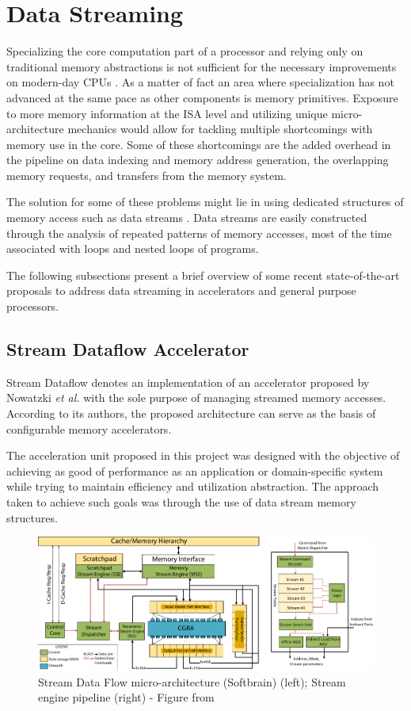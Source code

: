 \section{Data Streaming}
Specializing the core computation part of a processor and relying only on traditional memory abstractions is not sufficient for the necessary improvements on modern-day CPUs \cite{8192490}. As a matter of fact an area where specialization has not advanced at the same pace as other components is memory primitives. Exposure to more memory information at the ISA level and utilizing unique micro-architecture mechanics would allow for tackling multiple shortcomings with memory use in the core. Some of these shortcomings are the added overhead in the pipeline on data indexing and memory address generation, the overlapping memory requests, and transfers from the memory system.

The solution for some of these problems might lie in using dedicated structures of memory access such as data streams \cite{8192490}. Data streams are easily constructed through the analysis of repeated patterns of memory accesses, most of the time associated with loops and nested loops of programs.

The following subsections present a brief overview of some recent state-of-the-art proposals to address data streaming in accelerators and general purpose processors.


\subsection{Stream Dataflow Accelerator}
\label{label:stream_dataflow}
Stream Dataflow denotes an implementation of an accelerator proposed by Nowatzki \textit{et al.} \cite{8192490} with the sole purpose of managing streamed memory accesses. According to its authors, the proposed architecture can serve as the basis of configurable memory accelerators.

The acceleration unit proposed in this project was designed with the objective of achieving as good of performance as an application or domain-specific system while trying to maintain efficiency and utilization abstraction. The approach taken to achieve such goals was through the use of data stream memory structures.

\begin{figure}[H]
	\begin{center}
 		\includegraphics[width=0.87\linewidth]{images/stream-dataflow arch.pdf}
 		\caption{Stream Data Flow micro-architecture (Softbrain) (left); Stream engine pipeline (right) - Figure from \cite{8192490}}
 		\label{fig:stream-dataflow_arch}
	\end{center} 
\end{figure}

